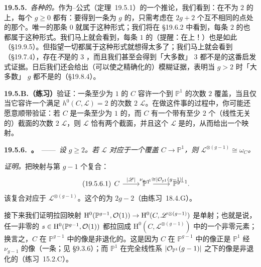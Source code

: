 \textbf{19.5.5.}\ \emph{各种\trGenus{}的\trCurve。}\quad 作为\trHyperelliptic{}\trRiemann--\trHurwitz{}公式（\mbox{定理~19.5.1}）的一个推论，我们看到：在\trCharacteristic{}不为 $2$ 的\trAlgClosedField{}上，每个\trGenus{} $g\ge 0$ 都有\trCurve：要得到一条\trGenus{}为 $g$ 的\trCurve，只需考虑在 $2g+2$ 个互不相同的点处\trRamification{}的那个\trBranchedCover。唯一的那条\trGenus{} $0$ \trCurve{}就属于这种形式；我们将在 \S19.6.2 中看到，每条\trGenus{} $2$ 的\trCurve{}也都属于这种形式。我们马上就会看到，每条\trGenus{} $1$ 的\trCurve{}（提醒：在\trAlgClosedField{}上！）也是如此（\S19.9.5）。但指望一切\trCurve{}都属于这种形式就想得太多了；我们马上就会看到（\S19.7.4），存在\emph{不}是\trHyperelliptic{}的\trGenus{} $3$ \trCurve，而且我们甚至会得到「大多数」\trGenus{} $3$ \trCurve{}都不是\trHyperelliptic{}的这番启发式证据。日后我们还会给出（可以使之精确化的）模糊证据，表明当 $g>2$ 时「大多数」\trGenus{} $g$ \trCurve{}都不是\trHyperelliptic{}的（\S19.8.4）。

\textbf{19.5.B.（练习）}\quad 验证：一条\trGenus{}至少为 $1$ 的\trCurve{} $C$ 容许一个到 $\mathbb{P}^1$ 的次数 $2$ 覆盖，当且仅当它容许一个满足 $h^0(C,\mathscr{L})=2$ 的次数 $2$ \trInvertibleSheaf{} $\mathscr{L}$。在做这件事的过程中，你可能还愿意顺带验证：若 $C$ 是一条\trGenus{}至少为 $1$ 的\trCurve，而 $C$ 有一个带有至少 $2$ 个（线性无关的）截面的次数 $2$ \trInvertibleSheaf{} $\mathscr{L}$，则 $\mathscr{L}$ 恰有两个截面，并且这个 $\mathscr{L}$ 是\trBasePointFree{}的，从而给出一个\trHyperelliptic{}映射。

\textbf{19.5.6.\ \trhProposition。}\ ——\ \emph{设 $g\ge 2$。若 $\mathscr{L}$ 对应于一个\trHyperelliptic{}覆盖 $C\to\mathbb{P}^1$，则 $\mathscr{L}^{\otimes(g-1)}\cong\omega_C$。}

\emph{证明。}\quad 把\trHyperelliptic{}映射与第 $g-1$ 个\trVeroneseEmbedding{}复合：
\begin{equation*}\tag{19.5.6.1}\label{eq:hyperelliptic-veronese}
\begin{tikzcd}
C \rar["|\mathscr{L}|"] & \mathbb{P}^1 \rar["\nu_{g-1}\cong|\OO_{\mathbb{P}^1}(g-1)|"] & \mathbb{P}^{g-1}.
\end{tikzcd}
\end{equation*}
该复合对应于 $\mathscr{L}^{\otimes(g-1)}$。这个\trInvertibleSheaf{}的\trDegree{}为 $2g-2$（由\mbox{练习~18.4.G}）。

接下来我们证明拉回映射 $\mathrm{H}^0(\mathbb{P}^{g-1},\mathcal{O}(1))\to\mathrm{H}^0(C,\mathscr{L}^{\otimes(g-1)})$ 是单射；也就是说，任一非零的 $s\in\mathrm{H}^0(\mathbb{P}^{g-1},\mathcal{O}(1))$ 都拉回成 $\mathrm{H}^0(C,\mathscr{L}^{\otimes(g-1)})$ 中的一个非零元素；换言之，$C$ 在 $\mathbb{P}^{g-1}$ 中的像是非退化的。这是因为 $C$ 在 $\mathbb{P}^{g-1}$ 中的像正是 $\mathbb{P}^1$ 经 $\nu_{g-1}$ 的像（一条\trRationalNormalCurve；见 \S9.3.6）；而 $\mathbb{P}^1$ 在完全线性系 $|\mathcal{O}_{\mathbb{P}^1}(g-1)|$ 之下的像是非退化的（\mbox{练习~15.2.C}）。

